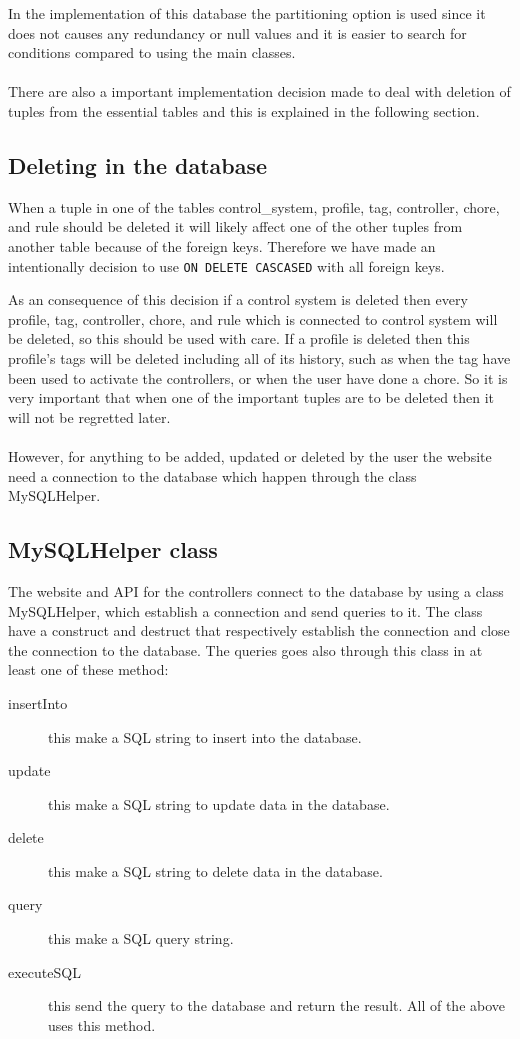In the implementation of this database the partitioning option is used since it does not causes any redundancy or null values and it is easier to search for conditions compared to using the main classes.  \\\\


There are also a important implementation decision made to deal with deletion of tuples from the essential tables and this is explained in the following section.
 
\subsection{Deleting in the database}
When a tuple in one of the tables control\_system, profile, tag, controller, chore, and rule should be deleted it will likely affect one of the other tuples from another table because of the foreign keys. Therefore we have made an intentionally decision to use \texttt{ON DELETE CASCASED} with all foreign keys.

As an consequence of this decision if a control system is deleted then every profile, tag, controller, chore, and rule which is connected to control system will be deleted, so this should be used with care. 
If a profile is deleted then this profile's tags will be deleted including all of its history, such as when the tag have been used to activate the controllers, or when the user have done a chore. So it is very important that when one of the important tuples are to be deleted then it will not be regretted later. \\\\

However, for anything to be added, updated or deleted by the user the website need a connection to the database which happen through the class MySQLHelper. 

\subsection{MySQLHelper class}
The website and API for the controllers connect to the database by using a class MySQLHelper, which establish a connection and send queries to it. The class have a construct and destruct that respectively establish the connection and close the connection to the database. The queries goes also through this class in at least one of these method:

\begin{description}
	\item[insertInto] this make a SQL string to insert into the database.
	\item[update] this make a SQL string to update data in the database.	
	\item[delete] this make a SQL string to delete data in the database.
	\item[query] this make a SQL query string.
	\item[executeSQL] this send the query to the database and return the result. All of the above uses this method.
\end{description}
  


